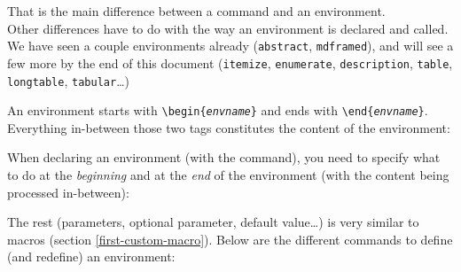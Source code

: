 That is the main difference between a command and an environment. \\
Other differences have to do with the way an environment is declared and called. \\

We have seen a couple environments already (\texttt{abstract}, \texttt{mdframed}), and will see a few more by the end of this document (\texttt{itemize}, \texttt{enumerate}, \texttt{description}, \texttt{table}, \texttt{longtable}, \texttt{tabular}\ldots)

An environment starts with \texttt{\textbackslash begin\{\emph{envname}\}} and ends with \texttt{\textbackslash end\{\emph{envname}\}}. Everything in-between those two tags constitutes the content of the environment:


\bigskip


When declaring an environment (with the  command), you need to specify what to do at the \emph{beginning} and at the \emph{end} of the environment (with the content being processed in-between):


\bigskip



The rest (parameters, optional parameter, default value\dots) is very similar to macros (section \ref{first-custom-macro}). Below are the different commands to define (and redefine) an environment:


